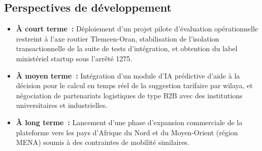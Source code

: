 \subsection*{Perspectives de développement}
\begin{itemize}[leftmargin=1.8em]
  \item \textbf{À court terme~:} Déploiement d'un projet pilote d'évaluation opérationnelle restreint à l'axe routier Tlemcen-Oran, stabilisation de l'isolation transactionnelle de la suite de tests d'intégration, et obtention du label ministériel startup sous l'arrêté 1275.
  \item \textbf{À moyen terme~:} Intégration d'un module d'IA prédictive d'aide à la décision pour le calcul en temps réel de la suggestion tarifaire par wilaya, et négociation de partenariats logistiques de type B2B avec des institutions universitaires et industrielles.
  \item \textbf{À long terme~:} Lancement d'une phase d'expansion commerciale de la plateforme vers les pays d'Afrique du Nord et du Moyen-Orient (région MENA) soumis à des contraintes de mobilité similaires.
\end{itemize}
